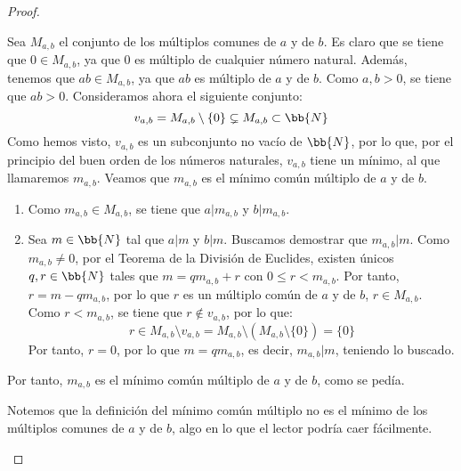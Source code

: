 \begin{ejercicio}
\begin{proof}
\begin{itemize}
            Sea $M_{a,b}$ el conjunto de los múltiplos comunes de $a$ y de $b$.
            Es claro que se tiene que $0\in M_{a,b}$, ya que $0$ es múltiplo de cualquier número natural. Además, tenemos que
            $ab\in M_{a,b}$, ya que $ab$ es múltiplo de $a$ y de $b$. Como $a,b>0$, se tiene que $ab>0$.
            Consideramos ahora el siguiente conjunto:
            \begin{equation*}
                v_{a,b} = M_{a,b}\setminus \{0\} \subsetneq M_{a,b} \subset \bb{N}
            \end{equation*}
            Como hemos visto, $v_{a,b}$ es un subconjunto no vacío de $\bb{N}$, por lo que, por el principio del buen orden de los números naturales, $v_{a,b}$ tiene un mínimo, al que llamaremos $m_{a,b}$.
           Veamos que $m_{a,b}$ es el mínimo común múltiplo de $a$ y de $b$.
           \begin{enumerate}
                \item Como $m_{a,b}\in M_{a,b}$, se tiene que $a|m_{a,b}$ y $b|m_{a,b}$.
                \item Sea $m\in \bb{N}$ tal que $a|m$ y $b|m$. Buscamos demostrar que $m_{a,b}|m$.
                Como $m_{a,b}\neq 0$, por el Teorema de la División de Euclides, existen únicos $q,r\in \bb{N}$ tales que $m = qm_{a,b} + r$ con $0\leq r < m_{a,b}$.
                Por tanto, $r = m - qm_{a,b}$, por lo que $r$ es un múltiplo común de $a$ y de $b$, $r\in M_{a,b}$.
                Como $r<m_{a,b}$, se tiene que $r\notin v_{a,b}$, por lo que:
                \begin{equation*}
                    r \in M_{a,b}\setminus v_{a,b} = M_{a,b}\setminus (M_{a,b}\setminus \{0\}) = \{0\}
                \end{equation*}
                Por tanto, $r=0$, por lo que $m = qm_{a,b}$, es decir, $m_{a,b}|m$, teniendo lo buscado.
           \end{enumerate}
           Por tanto, $m_{a,b}$ es el mínimo común múltiplo de $a$ y de $b$, como se pedía.
        \end{itemize}
        \begin{observacion}
            Notemos que la definición del mínimo común múltiplo no es el mínimo de los múltiplos comunes de $a$ y de $b$,
            algo en lo que el lector podría caer fácilmente.
        \end{observacion}
    \end{proof}
\end{ejercicio}


